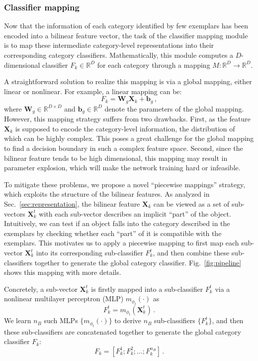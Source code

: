 \documentclass[10pt,twocolumn,letterpaper]{article}
\begin{document}
\subsubsection{Classifier mapping}\label{sec:classifier_mapping}

Now that the information of each category identified by few exemplars has been encoded into a bilinear feature vector, the task of the classifier mapping module is to map these intermediate category-level representations into their corresponding category classifiers. Mathematically, this module computes a $D$-dimensional classifier $F_k\in\mathbb{R}^{D}$ for each category through a mapping $M:\mathbb{R}^{D}\rightarrow\mathbb{R}^{D}$. 

A straightforward solution to realize this mapping is via a global mapping, either linear or nonlinear. For example, a linear mapping can be:
\begin{equation}
F_k = \mathbf{W}_g\bm{X}_k +\mathbf{b}_g\,,
\end{equation}
where $\mathbf{W}_g\in\mathbb{R}^{D\times{D}}$ and $\mathbf{b}_g\in\mathbb{R}^{D}$ denote the parameters of the global mapping. However, this mapping strategy suffers from two drawbacks. First, as the feature $\bm{X}_k$ is supposed to encode the category-level information, the distribution of which can be highly complex. This poses a great challenge for the global mapping to find a decision boundary in such a complex feature space. Second, since the bilinear feature tends to be high dimensional, this mapping may result in parameter explosion, which will make the network training hard or infeasible. 

To mitigate these problems, we propose a novel ``piecewise mappings'' strategy, which exploits the structure of the bilinear features. As analyzed in Sec.~\ref{sec:representation}, the bilinear feature $\bm{X}_k$ can be viewed as a set of sub-vectors $\bm{X}^t_k$ with each sub-vector describes an implicit ``part'' of the object. Intuitively, we can test if an object falls into the category described in the exemplars by checking whether each ``part'' of it is compatible with the exemplars. This motivates us to apply a piecewise mapping to first map each sub-vector $\bm{X}^t_k$ into its corresponding sub-classifier $F_{k}^t$, and then combine these sub-classifiers together to generate the global category classifier. Fig.~\ref{fig:pipeline} shows this mapping with more details.

Concretely, a sub-vector $\bm{X}_k^t$ is firstly mapped into a sub-classifier $F_{k}^t$ via a nonlinear multilayer perceptron (MLP) $m_{\phi_t}(\cdot)$ as
\begin{equation}\label{eq:F}
F_{k}^{t} = m_{\phi_t}(\bm{X}_k^t)\,.
\end{equation}
We learn $n_B$ such MLPs $\{m_{\phi_t}(\cdot)\}$ to derive $n_B$ sub-classifiers $\{F_{k}^t\}$, and then these sub-classifiers are concatenated together to generate the global category classifier $F_k$:
\begin{equation}\label{eq:wholeF}
F_k = [F_{k}^1; F_{k}^2; \ldots; F_{k}^{n_B}]\,.
\end{equation}
\end{document}
